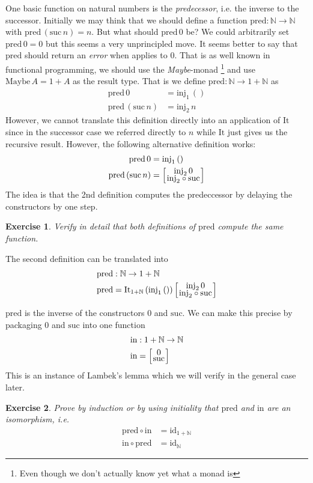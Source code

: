 \documentclass{article}
\newcommand{\id}{\mathrm{id}}
\newcommand{\Nat}{\mathbb{N}}
\newcommand{\suc}{\mathrm{suc}}
\newcommand{\Maybe}{\mathrm{Maybe}}
\newcommand{\inj}{\mathrm{inj}}
\newcommand{\case}[2]{{\setlength{\arraycolsep}{1pt}
   \renewcommand{\arraystretch}{0.6}\left[\begin{array}{c}#1\\#2\end{array}\right]}}
\newcommand{\It}{\mathrm{It}}
\newcommand{\pred}{\mathrm{pred}}
\newcommand{\inn}{\mathrm{in}}
\newtheorem{exercise}{Exercise}
\begin{document}
One basic function on natural numbers is the \emph{predecessor}, i.e. the inverse to the successor. Initially we may think that we should define a function $\pred : \Nat \to \Nat$ with $\pred\,(\suc\,n) = n$. But what should $\pred\,0$ be? We could arbitrarily set $\pred\,0 = 0$ but this seems a very unprincipled move. It seems better to say that $\pred$ should return an \emph{error} when applies to $0$. That is as well known in functional programming, we should use the \emph{Maybe}-monad
\footnote{Even though we don't actually know yet what a monad is}
and use $\Maybe\,A = 1 + A$ as the result type. That is we define $\pred : \Nat \to 1 + \Nat$ as
\begin{align*}
\pred\,0 & = \inj_1\,() \\
\pred\,(\suc\,n) & = \inj_2\,n
\end{align*}
However, we cannot translate this definition directly into an application of $\It$ since in the successor case we referred directly to $n$ while $\It$ just gives us the recursive result. However, the following alternative definition works:
\begin{align*}
\pred\,0 & = \inj_1\,() \\
\pred\,(\suc\,n) & = \case{\inj_2\,0}{\inj_2 \circ \suc}
\end{align*}
The idea is that the 2nd definition computes the predeccessor by delaying the constructors by one step.
\begin{exercise}
Verify in detail that both definitions of $\pred$ compute the same function.                     
\end{exercise}
The second definition can be translated into 
\begin{align*}
& \pred : \Nat \to 1+\Nat \\
& \pred = \It_{1+\Nat}\,(\inj_1\,())\, \case{\inj_2\,0}{\inj_2 \circ \suc}
\end{align*}

$\pred$ is the inverse of the constructors $0$ and $\suc$. We can make this precise by packaging $0$ and $\suc$ into one function 
\begin{align*}
& \inn : 1+\Nat \to \Nat \\
& \inn = \case{0}{\suc} 
\end{align*}
This is an instance of Lambek's lemma which we will verify in the general case later. 
\begin{exercise}
  Prove by induction or by using initiality that $\pred$ and $\inn$ are an isomorphism, i.e.
  \begin{align*}
    \pred \circ \inn & = \id_{1+\Nat} \\
    \inn \circ \pred & = \id_\Nat
  \end{align*}
\end{exercise}
\end{document}
